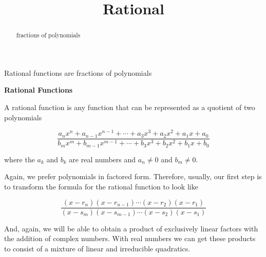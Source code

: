\documentclass{ximera}
\title{Rational}
\begin{document}
\begin{abstract}
fractions of polynomials
\end{abstract}
\maketitle




Rational functions are fractions of polynomials


\begin{definition}\textbf{\textcolor{green!50!black}{Rational Functions}}

A rational function is any function that can be represented as a quotient of two polynomials 

\[   \frac{ a_n x^n + a_{n-1} x^{n-1} + \cdots + a_3 x^3 + a_2 x^2 + a_1 x + a_0  } { b_m x^m + b_{m-1} x^{m-1} + \cdots + b_3 x^3 + b_2 x^2 + b_1 x + b_0 }   \]



where the $a_k$ and $b_k$ are real numbers and $a_n \ne 0$ and $b_m \ne 0$.





\end{definition}




Again, we prefer polynomials in factored form.  Therefore, usually, our first step is to transform the formula for the rational function to look like



\[   \frac{ (x-r_n)(x-r_{n-1})  \cdots (x-r_2)(x-r_1)  } { (x-s_m)(x-s_{m-1})  \cdots (x-s_2)(x-s_1) }   \]




And, again, we will be able to obtain a product of exclusively linear factors with the addition of complex numbers.  With real numbers we can get these products to consist of a mixture of linear and irreducible quadratics.
\end{document}
